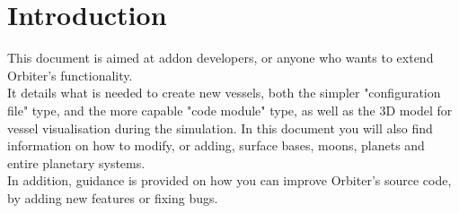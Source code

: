 \documentclass[Orbiter Developer Manual.tex]{subfiles}
\begin{document}
\section{Introduction}
This document is aimed at addon developers, or anyone who wants to extend Orbiter's functionality.\\
It details what is needed to create new vessels, both the simpler "configuration file" type, and the more capable "code module" type, as well as the 3D model for vessel visualisation during the simulation.
In this document you will also find information on how to modify, or adding, surface bases, moons, planets and entire planetary systems.\\
In addition, guidance is provided on how you can improve Orbiter's source code, by adding new features or fixing bugs.
\end{document}
